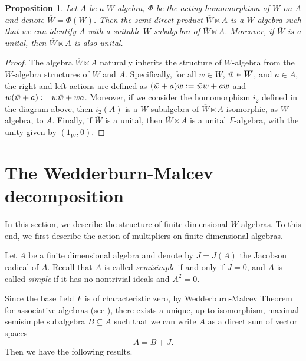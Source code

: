 \documentclass[reqno]{amsart}
\newtheorem{proposition}[theorem]{Proposition}
\theoremstyle{definition}
\numberwithin{equation}{section}
\numberwithin{theorem}{section}
\begin{document}
\begin{proposition}\label{prop: semi-direct product}
    Let $A$ be a $W$-algebra, $\Phi$ be the acting homomorphism of $W$ on $A$ and denote $\overline{W}=\Phi(W)$. Then the semi-direct product $\overline{W} \ltimes A$ is a $W$-algebra such that we can identify $A$ with a suitable $W$-subalgebra  of $\overline{W}\ltimes A$. Moreover, if $\overline{W}$ is a unital, then $\overline{W} \ltimes A$ is also unital. %
\end{proposition}
\begin{proof}
    The algebra $\overline{W} \ltimes A$ naturally inherits the structure of $W$-algebra from the $W$-algebra structures of $\overline{W}$ and $A$. Specifically, for all $w \in W$, $\Bar{w} \in \overline{W}$, and $a \in A$, the right and left actions are defined as $(\Bar{w}+a)w:=\Bar{w}w+aw$ and  $w(\Bar{w}+a):=w\Bar{w}+wa$. Moreover, if we consider the homomorphism $i_2$ defined in the diagram above, then $i_2(A)$ is a $W$-subalgebra  of $\overline{W}\ltimes A$ isomorphic, as $W$-algebra, to $A$.
    Finally, if $\overline{W}$ is a unital, then $\overline{W} \ltimes A$ is a unital $F$-algebra, with the unity given by $(1_{\overline{W}},0).$ 
\end{proof}







\section{The Wedderburn-Malcev decomposition}

In this section, we describe the structure of finite-dimensional $W$-algebras. To this end, we first describe the action of multipliers on finite-dimensional algebras.

Let $A$ be a finite dimensional algebra and denote by $J=J(A)$ the Jacobson radical of $A$. Recall that $A$ is called \emph{semisimple} if and only if $J=0$, and $A$ is called \emph{simple} if it has no nontrivial ideals and $A^2= 0$. 


Since the base field $F$ is of characteristic zero, by Wedderburn-Malcev Theorem for associative algebras (see \cite[Theorem 3.4.3]{GZbook}), there exists a unique, up to isomorphism, maximal semisimple subalgebra $B\subseteq A$ such that we can write $A$ as a direct sum of vector spaces
\begin{equation}\label{W-M decomposition}
    A=B+J.
\end{equation}
Then we have the following results.
\end{document}
